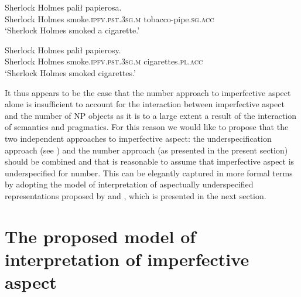 \documentclass[output=paper]{langscibook}
\begin{document}
\ea\label{jan-bla:fansb:kb:ex25}
\gll Sherlock Holmes palił papierosa.\\  
     Sherlock Holmes smoke.\textsc{ipfv}.\textsc{pst}.\textsc{3sg}.\textsc{m} tobacco-pipe.\textsc{sg}.\textsc{acc}\\
\glt ‘Sherlock Holmes smoked a cigarette.’
\z

\ea\label{jan-bla:fansb:kb:ex26}
\gll Sherlock Holmes palił papierosy.\\  
     Sherlock Holmes smoke.\textsc{ipfv}.\textsc{pst}.\textsc{3sg}.\textsc{m} cigarettes.\textsc{pl}.\textsc{acc}\\
\glt ‘Sherlock Holmes smoked cigarettes.’
\z

\noindent It thus appears to be the case that the number approach to imperfective aspect alone is insufficient to account for the interaction between imperfective aspect and the number of NP objects as it is to a large extent a result of the interaction of semantics and pragmatics. For this reason we would like to propose that the two independent approaches to imperfective aspect: the underspecification approach (see ) and the number approach (as presented in the present section) should be combined and that is reasonable to assume that imperfective aspect is underspecified for number. This can be elegantly captured in more formal terms by adopting the model of interpretation of aspectually underspecified representations proposed by \citet{Dolling2014} and \citet{Egg2005}, which is presented in the next section.

\section{The proposed model of interpretation of imperfective aspect}\label{jan-bla:fansb:kb:sec5}
\end{document}
